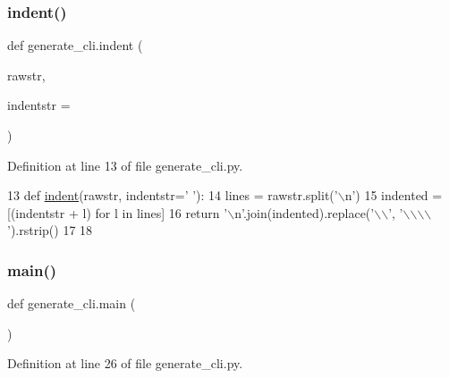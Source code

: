 \subsubsection{\texorpdfstring{indent()}{indent()}}
{\footnotesize\ttfamily def generate\+\_\+cli.\+indent (\begin{DoxyParamCaption}\item[{}]{rawstr,  }\item[{}]{indentstr = {\ttfamily \textquotesingle{}~~~~\textquotesingle{}} }\end{DoxyParamCaption})}



Definition at line 13 of file generate\+\_\+cli.\+py.


\begin{DoxyCode}
13 \textcolor{keyword}{def }\hyperlink{namespacegenerate__cli_a398461fabd4559f4d4d041df98c8cb43}{indent}(rawstr, indentstr='    '):
14     lines = rawstr.split(\textcolor{stringliteral}{'\(\backslash\)n'})
15     indented = [(indentstr + l) \textcolor{keywordflow}{for} l \textcolor{keywordflow}{in} lines]
16     \textcolor{keywordflow}{return} \textcolor{stringliteral}{'\(\backslash\)n'}.join(indented).replace(\textcolor{stringliteral}{'\(\backslash\)\(\backslash\)'}, \textcolor{stringliteral}{'\(\backslash\)\(\backslash\)\(\backslash\)\(\backslash\)'}).rstrip()
17 
18 
\end{DoxyCode}
\mbox{\label{namespacegenerate__cli_ac2397b33242e0f40a20f33a2ea5beebf}} 
\subsubsection{\texorpdfstring{main()}{main()}}
{\footnotesize\ttfamily def generate\+\_\+cli.\+main (\begin{DoxyParamCaption}{ }\end{DoxyParamCaption})}



Definition at line 26 of file generate\+\_\+cli.\+py.


